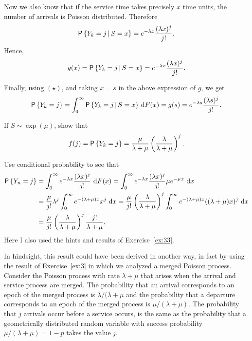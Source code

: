 \begin{exercise}
\begin{solution}
    Now we also know that if the service time takes precisely $x$ time
    units, the number of arrivals is Poisson distributed. Therefore
    \begin{equation*}
    \P{Y_k =j\given S=x} = e^{-\lambda x}\frac{(\lambda x)^j}{j!}.
    \end{equation*}
Hence, 
    \begin{equation*}
    g(x) = \P{Y_k =j\given S=x} = e^{-\lambda x}\frac{(\lambda x)^j}{j!}.
    \end{equation*}


    Finally, using $(\star)$, and taking $x=s$ in the above expression of $g$, we get
    \begin{equation*}
    \P{Y_k=j} = \int_0^\infty \P{Y_k =j\given S=x} \d F(x) = 
    g(s) = e^{-\lambda s}\frac{(\lambda s)^j}{j!}.
    \end{equation*}
  \end{solution}
\end{exercise}

\begin{exercise}
 If $S\sim \exp(\mu)$, show that 
  \begin{equation} \label{eq:41}
f(j) = \P{Y_k = j} = \frac{\mu}{\lambda+\mu}\left(\frac{\lambda}{\lambda+\mu}\right)^j.
  \end{equation}
  \begin{solution}
Use conditional probability to see that 
\begin{equation*}
  \begin{split}
  \P{Y_n = j} 
&= \int_0^\infty e^{-\lambda x}\frac{(\lambda x)^j}{j!}\, \d F(x) = \int_0^\infty e^{-\lambda x}\frac{(\lambda x)^j}{j!} \mu e^{-\mu x}\, \d x \\
&= \frac{\mu}{j!}\lambda^j \int_0^\infty e^{-(\lambda+\mu) x}x^j\,\d x = \frac{\mu}{j!}\left(\frac{\lambda}{\lambda+\mu}\right)^j \int_0^\infty e^{-(\lambda+\mu) x}((\lambda+\mu)x)^j\,\d x \\
&= \frac{\mu}{j!}\left(\frac{\lambda}{\lambda+\mu}\right)^j \frac{j!}{\lambda+\mu}.
\end{split}
\end{equation*}
Here I also used the hints and  results of Exercise~\ref{ex:33}.

In hindsight, this result could have been derived in another way, in
fact by using the result of Exercise~\ref{ex:3} in which we analyzed a
merged Poisson process. Consider the Poisson process with rate
$\lambda+\mu$ that arises when the arrival and service process are
merged. The probability that an arrival corresponds to an epoch of the
merged process is $\lambda/(\lambda+\mu$ and the probability that a
departure corresponds to an epoch of the merged process is
$\mu/(\lambda+\mu)$.  The probability that $j$ arrivals occur before a
service occurs, is the same as the probability that a geometrically
distributed random variable with success probability
$\mu/(\lambda+\mu) = 1-p$ takes the value $j$.
  \end{solution}
\end{exercise}

